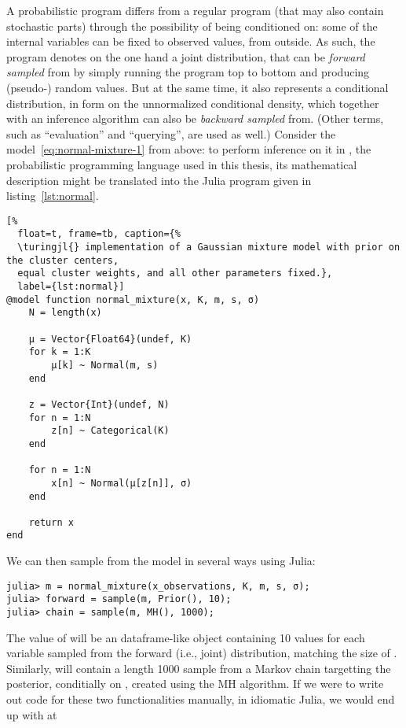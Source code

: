 A probabilistic program differs from a regular program (that may also contain stochastic parts)
through the possibility of being conditioned on: some of the internal variables can be fixed to
observed values, from outside. As such, the program denotes on the one hand a joint distribution,
that can be \emph{forward sampled} from by simply running the program top to bottom and producing
(pseudo-) random values.  But at the same time, it also represents a conditional distribution, in
form on the unnormalized conditional density, which together with an inference algorithm can also be
\emph{backward sampled} from.  (Other terms, such as \enquote{evaluation} and \enquote{querying},
are used as well.)  Consider the model~\eqref{eq:normal-mixture-1} from above: to perform inference
on it in \turingjl{} \parencite{ge2018turing}, the probabilistic programming language used in this
thesis, its mathematical description might be translated into the Julia program given in
listing~\ref{lst:normal}.
\begin{lstlisting}[%
  float=t, frame=tb, caption={%
  \turingjl{} implementation of a Gaussian mixture model with prior on the cluster centers,
  equal cluster weights, and all other parameters fixed.},
  label={lst:normal}]
@model function normal_mixture(x, K, m, s, σ)
    N = length(x)

    μ = Vector{Float64}(undef, K)
    for k = 1:K
        μ[k] ~ Normal(m, s)
    end

    z = Vector{Int}(undef, N)
    for n = 1:N
        z[n] ~ Categorical(K)
    end

    for n = 1:N
        x[n] ~ Normal(μ[z[n]], σ)
    end

    return x
end
\end{lstlisting}
We can then sample from the model in several ways using Julia:
\begin{lstlisting}
julia> m = normal_mixture(x_observations, K, m, s, σ);
julia> forward = sample(m, Prior(), 10);
julia> chain = sample(m, MH(), 1000);
\end{lstlisting}
The value of  will be an dataframe-like object containing 10 values for each variable
sampled from the forward (i.e., joint) distribution, matching the size of .
Similarly,  will contain a length 1000 sample from a Markov chain targetting the
posterior, conditially on , created using the MH algorithm.  If we were to
write out code for these two functionalities manually, in idiomatic Julia, we would end up with at
